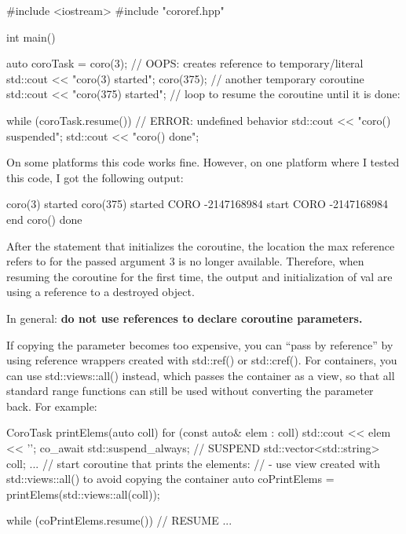 
\begin{cpp}
#include <iostream>
#include "cororef.hpp"

int main()
{
	auto coroTask = coro(3); // OOPS: creates reference to temporary/literal
	std::cout << "coro(3) started\n";
	coro(375); // another temporary coroutine
	std::cout << "coro(375) started\n";
	// loop to resume the coroutine until it is done:
	
	while (coroTask.resume()) { // ERROR: undefined behavior
		std::cout << "coro() suspended\n";
	}
	std::cout << "coro() done\n";
}
\end{cpp}

On some platforms this code works fine. However, on one platform where I tested this code, I got the following output:

\begin{shell}
coro(3) started
coro(375) started
  CORO -2147168984 start
  CORO -2147168984 end
coro() done
\end{shell}

After the statement that initializes the coroutine, the location the max reference refers to for the passed argument 3 is no longer available. Therefore, when resuming the coroutine for the first time, the output and initialization of val are using a reference to a destroyed object.

In general: \textbf{do not use references to declare coroutine parameters.}

If copying the parameter becomes too expensive, you can “pass by reference” by using reference wrappers created with std::ref() or std::cref(). For containers, you can use std::views::all() instead, which passes the container as a view, so that all standard range functions can still be used without converting the parameter back. For example:

\begin{cpp}
CoroTask printElems(auto coll)
{
	for (const auto& elem : coll) {
		std::cout << elem << '\n';
		co_await std::suspend_always{}; // SUSPEND
	}
}
std::vector<std::string> coll;
...
// start coroutine that prints the elements:
// - use view created with std::views::all() to avoid copying the container
auto coPrintElems = printElems(std::views::all(coll));

while (coPrintElems.resume()) { // RESUME
...
}
\end{cpp}


